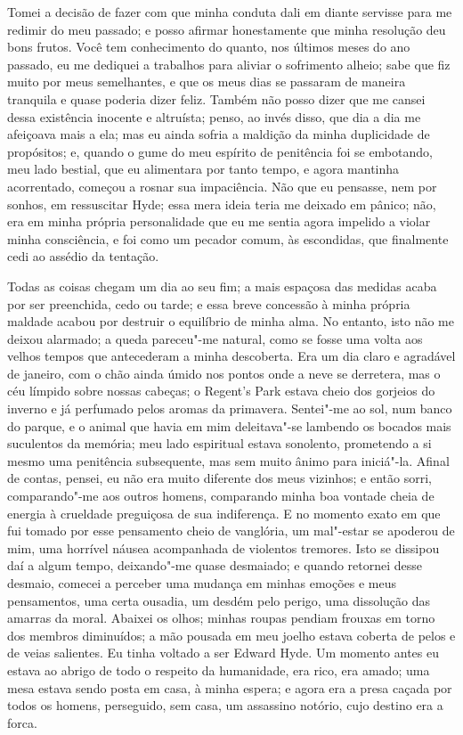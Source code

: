 Tomei a decisão de fazer com que minha conduta dali em diante servisse
para me redimir do meu passado; e posso afirmar honestamente que minha
resolução deu bons frutos.  Você tem conhecimento do quanto, nos
últimos meses do ano passado, eu me dediquei a trabalhos para aliviar o
sofrimento alheio; sabe que fiz muito por meus semelhantes, e que os
meus dias se passaram de maneira tranquila e quase poderia dizer feliz.
Também não posso dizer que me cansei dessa existência inocente e
altruísta; penso, ao invés disso, que dia a dia me afeiçoava mais a
ela; mas eu ainda sofria a maldição da minha duplicidade de propósitos;
e, quando o gume do meu espírito de penitência foi se embotando, meu
lado bestial, que eu alimentara por tanto tempo, e agora mantinha
acorrentado, começou a rosnar sua impaciência.  Não que eu pensasse,
nem por sonhos, em ressuscitar Hyde; essa mera ideia teria me
deixado em pânico; não, era em minha própria personalidade que eu me
sentia agora impelido a violar minha consciência, e foi como um pecador
comum, às escondidas, que finalmente cedi ao assédio da tentação. 

Todas as coisas chegam um dia ao seu fim; a mais espaçosa das medidas
acaba por ser preenchida, cedo ou tarde; e essa breve concessão à minha
própria maldade acabou por destruir o equilíbrio de minha alma.  No
entanto, isto não me deixou alarmado; a queda pareceu"-me natural, como
se fosse uma volta aos velhos tempos que antecederam a minha
descoberta.  Era um dia claro e agradável de janeiro, com o chão ainda
úmido nos pontos onde a neve se derretera, mas o céu límpido sobre
nossas cabeças; o Regent’s Park estava cheio dos gorjeios do inverno e
já perfumado pelos aromas da primavera.  Sentei"-me ao sol, num banco do
parque, e o animal que havia em mim deleitava"-se lambendo os bocados
mais suculentos da memória; meu lado espiritual estava sonolento,
prometendo a si mesmo uma penitência subsequente, mas sem muito ânimo
para iniciá"-la.  Afinal de contas, pensei, eu não era muito diferente
dos meus vizinhos; e então sorri, comparando"-me aos outros homens,
comparando minha boa vontade cheia de energia à crueldade preguiçosa de
sua indiferença.  E no momento exato em que fui tomado por esse
pensamento cheio de vanglória, um mal"-estar se apoderou de mim, uma
horrível náusea acompanhada de violentos tremores.  Isto se dissipou
daí a algum tempo, deixando"-me quase desmaiado; e quando retornei
desse desmaio, comecei a perceber uma mudança em minhas emoções e meus
pensamentos, uma certa ousadia, um desdém pelo perigo, uma dissolução
das amarras da moral.  Abaixei os olhos; minhas roupas pendiam frouxas
em torno dos membros diminuídos; a mão pousada em meu joelho estava
coberta de pelos e de veias salientes.  Eu tinha voltado a ser Edward
Hyde.  Um momento antes eu estava ao abrigo de todo o respeito da
humanidade, era rico, era amado; uma mesa estava sendo posta em casa, à
minha espera; e agora era a presa caçada por todos os homens,
perseguido, sem casa, um assassino notório, cujo destino era a forca.

